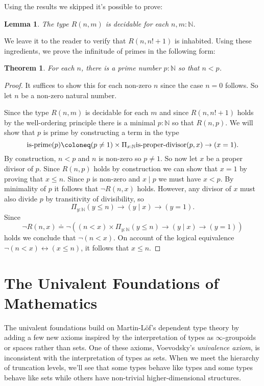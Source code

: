 \documentclass{amsart}
\theoremstyle{theorem}
\newtheorem*{thm}{Theorem}
\newtheorem*{lem}{Lemma}
\theoremstyle{definition}
\theoremstyle{remark}
\newcommand{\0}{\mathbbe{0}}
\newcommand{\1}{\mathbbe{1}}
\newcommand{\2}{\mathbbe{2}}
\newcommand{\3}{\mathbbe{3}}
\newcommand{\4}{\mathbbe{4}}
\newcommand{\type}[1]{{\textup{#1}}}
\newcommand{\bN}{{\mathbb{N}}}
\begin{document}
Using the results we skipped it's possible to prove:

\begin{lem} The type $R(n,m)$ is decidable for each $n, m : \bN$.
\end{lem}

We leave it to the reader to verify that $R(n,n!+1)$ is inhabited. Using these ingredients, we prove the infinitude of primes in the following form:

\begin{thm} For each $n$, there is a prime number $p : \bN$ so that $n < p$.
  \end{thm}
  \begin{proof}
    It suffices to show this for each non-zero $n$ since the case $n=0$ follows. So let $n$ be a non-zero natural number.

    Since the type $R(n,m)$ is decidable for each $m$ and since $R(n,n!+1)$ holds by the well-ordering principle there is a minimal $p : \bN$ so that $R(n,p)$. We will show that $p$ is prime by constructing a term in the type
    \[ \type{is-prime}(p) \coloneq (p \neq 1) \times \Pi_{x: \bN} \type{is-proper-divisor}(p,x) \to (x = 1).\]
    By construction, $n < p$ and $n$ is non-zero so $p \neq 1$. So now let $x$ be a proper divisor of $p$. Since $R(n,p)$ holds by construction we can show that $x=1$ by proving that $x \leq n$. Since $p$ is non-zero and $x \mid p$ we must have $x < p$. By minimality of $p$ it follows that $\neg R(n,x)$ holds. However, any divisor of $x$ must also divide $p$ by transitivity of divisibility, so \[
      \Pi_{y : \bN} (y \leq n) \to (y \mid x) \to (y=1).\]
    Since \[\neg R(n,x) \doteq \neg \left((n < x) \times \Pi_{y : \bN} (y \leq n) \to (y \mid x) \to (y=1) \right)\]
         holds we conclude that $\neg(n < x)$. On account of the logical equivalence $\neg(n < x ) \leftrightarrow (x \leq n)$, it follows that $x \leq n$.
  \end{proof}
 
  
\part{The Univalent Foundations of Mathematics}

The univalent foundations build on Martin-L\"{o}f's dependent type theory by adding a few new axioms inspired by the interpretation of types as $\infty$-groupoids or spaces rather than sets. One of these axioms, Voevodsky's \emph{univalence axiom}, is inconsistent with the interpretation of types as sets. When we meet the hierarchy of truncation levels, we'll see that some types behave like types and some types behave like sets while others have non-trivial higher-dimensional structures. 
\end{document}

